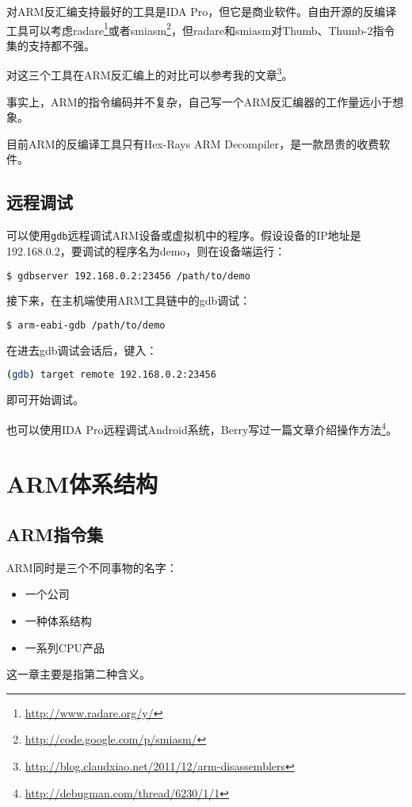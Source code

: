 对ARM反汇编支持最好的工具是IDA Pro，但它是商业软件。自由开源的反编译工具可以考虑radare\footnote{\href{http://www.radare.org/y/}{http://www.radare.org/y/}}或者smiasm\footnote{\href{http://code.google.com/p/smiasm/}{http://code.google.com/p/smiasm/}}，但radare和smiasm对Thumb、Thumb-2指令集的支持都不强。

对这三个工具在ARM反汇编上的对比可以参考我的文章\footnote{\href{http://blog.claudxiao.net/2011/12/arm-disassemblers}{http://blog.claudxiao.net/2011/12/arm-disassemblers}}。

事实上，ARM的指令编码并不复杂，自己写一个ARM反汇编器的工作量远小于想象。

目前ARM的反编译工具只有Hex-Rays ARM Decompiler，是一款昂贵的收费软件。
\subsection{远程调试}
可以使用\lstinline!gdb!远程调试ARM设备或虚拟机中的程序。假设设备的IP地址是192.168.0.2，要调试的程序名为demo，则在设备端运行：
\begin{lstlisting}[language=bash, numbers=none]
  $ gdbserver 192.168.0.2:23456 /path/to/demo
\end{lstlisting}

接下来，在主机端使用ARM工具链中的gdb调试：
\begin{lstlisting}[language=bash, numbers=none]
  $ arm-eabi-gdb /path/to/demo
\end{lstlisting}

在进去gdb调试会话后，键入：
\begin{lstlisting}[language=bash, numbers=none]
  (gdb) target remote 192.168.0.2:23456
\end{lstlisting}

即可开始调试。

也可以使用IDA Pro远程调试Android系统，Berry写过一篇文章介绍操作方法\footnote{\href{http://debugman.com/thread/6230/1/1}{http://debugman.com/thread/6230/1/1}}。
\section{ARM体系结构}
\subsection{ARM指令集}
ARM同时是三个不同事物的名字：
\begin{itemize}
\item 一个公司
\item 一种体系结构
\item 一系列CPU产品
\end{itemize}
这一章主要是指第二种含义。

